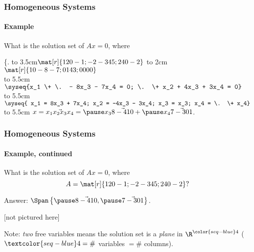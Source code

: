 \begin{frame}
\frametitle{Homogeneous Systems}
\framesubtitle{Example}

\begin{overlayarea}{\textwidth}{1.2cm}
\vskip-3mm
\begin{ques}
  What is the solution set of $Ax=0$, where 
\end{ques}
\end{overlayarea}

\spalignsysdelims\{.
\pause
\leavevmode
\hbox to 3.5cm{\hfil$\mat[r]{1 2 0 -1; -2 -3 4 5; 2 4 0 -2}$}%
\pause
\hbox to 2cm{\hfil{}}
\quad$\mat[r]{1 0 -8 -7; 0 1 4 3; 0 0 0 0}$\\[2mm]
\leavevmode
\pause
\hbox to 5.5cm{\hfil\longsquiggly[equations]}\quad 
$\syseq{x_1 \+ \. - 8x_3 - 7x_4 = 0;
        \. \+ x_2 + 4x_3 + 3x_4 = 0}$\\[2mm]
\medskip
\leavevmode
\pause
\hbox to 5.5cm{\hfil{}}\quad 
$\syseq{
  x_1 = 8x_3 + 7x_4; 
  x_2 = -4x_3 - 3x_4; 
  x_3 = x_3; 
  x_4 = \. \+ x_4}$\\[2mm]
\medskip
\leavevmode
\pause
\hbox to 5.5cm{\hfil{}}\quad 
$x = \vec{x_1 x_2 x_3 x_4} = \pause x_3\vec{8 -4 1 0} + \pause x_4\vec{7 -3 0 1}$.

\end{frame}



\begin{frame}
\frametitle{Homogeneous Systems}
\framesubtitle{Example, continued}

\vskip-3mm
\begin{ques}
  What is the solution set of $Ax=0$, where
  \[ A = \mat[r]{1 2 0 -1; -2 -3 4 5; 2 4 0 -2}? \]
\end{ques}

\alert{Answer: } $\Span\left\{\pause\vec{8 -4 1 0}, \pause\vec{7 -3 0 1}\right\}$.

\pause\vfill

\begin{center}
  \color{gray}[not pictured here]
\end{center}

\pause\vfill
\alert{Note:} \emph{two} free variables means the solution set is a \emph{plane}
in $\R^{\color{seq-blue}4}$ ($\textcolor{seq-blue}4={}\#$ variables  $=\#$ columns).


\end{frame}


